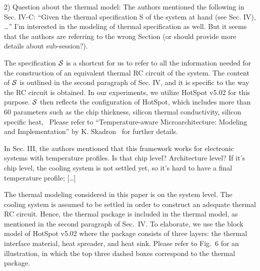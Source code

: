 \begin{reviewer}
2) Question about the thermal model: The authors mentioned the following in Sec. IV-C: “Given the thermal specification S of the system at hand (see Sec. IV), …” I’m interested in the modeling of thermal specification as well. But it seems that the authors are referring to the wrong Section (or should provide more details about sub-session?).
\end{reviewer}
\begin{authors}
The specification $\mathcal{S}$ is a shortcut for us to refer to all the information needed for the construction of an equivalent thermal RC circuit of the system.
The content of $\mathcal{S}$ is outlined in the second paragraph of Sec. IV, and it is specific to the way the RC circuit is obtained.
In our experiments, we utilize HotSpot v5.02 for this purpose.
$\mathcal{S}$ then reflects the configuration of HotSpot, which includes more than 60 parameters such as the chip thickness, silicon thermal conductivity, silicon specific heat, \etc\ Please refer to ``Temperature-aware Microarchitecture: Modeling and Implementation'' by K. Skadron \etal\ for further details.



\end{authors}

\begin{reviewer}
In Sec. III, the authors mentioned that this framework works for electronic systems with temperature profiles. Is that chip level? Architecture level? If it’s chip level, the cooling system is not settled yet, so it’s hard to have a final temperature profile; [\ldots]
\end{reviewer}
\begin{authors}
The thermal modeling considered in this paper is on the system level.
The cooling system is assumed to be settled in order to construct an adequate thermal RC circuit.
Hence, the thermal package is included in the thermal model, as mentioned in the second paragraph of Sec.~IV.
To elaborate, we use the block model of HotSpot v5.02 where the package consists of three layers: the thermal interface material, heat spreader, and heat sink.
Please refer to Fig.~6 for an illustration, in which the top three dashed boxes correspond to the thermal package.

\end{authors}

